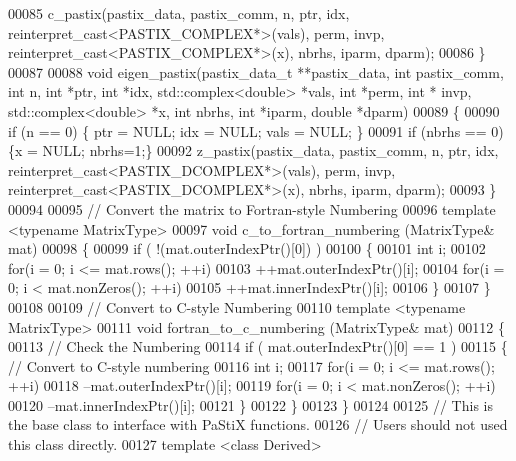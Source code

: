 \begin{DoxyCode}
00085     c\_pastix(pastix\_data, pastix\_comm, n, ptr, idx, reinterpret\_cast<PASTIX\_COMPLEX*>(vals), perm, invp, 
      reinterpret\_cast<PASTIX\_COMPLEX*>(x), nbrhs, iparm, dparm); 
00086   \}
00087   
00088   \textcolor{keywordtype}{void} eigen\_pastix(pastix\_data\_t **pastix\_data, \textcolor{keywordtype}{int} pastix\_comm, \textcolor{keywordtype}{int} n, \textcolor{keywordtype}{int} *ptr, \textcolor{keywordtype}{int} *idx, 
      std::complex<double> *vals, \textcolor{keywordtype}{int} *perm, \textcolor{keywordtype}{int} * invp, std::complex<double> *x, \textcolor{keywordtype}{int} nbrhs, \textcolor{keywordtype}{int} *iparm, \textcolor{keywordtype}{double} *dparm)
00089   \{
00090     \textcolor{keywordflow}{if} (n == 0) \{ ptr = NULL; idx = NULL; vals = NULL; \}
00091     \textcolor{keywordflow}{if} (nbrhs == 0) \{x = NULL; nbrhs=1;\}
00092     z\_pastix(pastix\_data, pastix\_comm, n, ptr, idx, reinterpret\_cast<PASTIX\_DCOMPLEX*>(vals), perm, invp, 
      reinterpret\_cast<PASTIX\_DCOMPLEX*>(x), nbrhs, iparm, dparm); 
00093   \}
00094 
00095   \textcolor{comment}{// Convert the matrix  to Fortran-style Numbering}
00096   \textcolor{keyword}{template} <\textcolor{keyword}{typename} MatrixType>
00097   \textcolor{keywordtype}{void} c\_to\_fortran\_numbering (MatrixType& mat)
00098   \{
00099     \textcolor{keywordflow}{if} ( !(mat.outerIndexPtr()[0]) ) 
00100     \{ 
00101       \textcolor{keywordtype}{int} i;
00102       \textcolor{keywordflow}{for}(i = 0; i <= mat.rows(); ++i)
00103         ++mat.outerIndexPtr()[i];
00104       \textcolor{keywordflow}{for}(i = 0; i < mat.nonZeros(); ++i)
00105         ++mat.innerIndexPtr()[i];
00106     \}
00107   \}
00108   
00109   \textcolor{comment}{// Convert to C-style Numbering}
00110   \textcolor{keyword}{template} <\textcolor{keyword}{typename} MatrixType>
00111   \textcolor{keywordtype}{void} fortran\_to\_c\_numbering (MatrixType& mat)
00112   \{
00113     \textcolor{comment}{// Check the Numbering}
00114     \textcolor{keywordflow}{if} ( mat.outerIndexPtr()[0] == 1 ) 
00115     \{ \textcolor{comment}{// Convert to C-style numbering}
00116       \textcolor{keywordtype}{int} i;
00117       \textcolor{keywordflow}{for}(i = 0; i <= mat.rows(); ++i)
00118         --mat.outerIndexPtr()[i];
00119       \textcolor{keywordflow}{for}(i = 0; i < mat.nonZeros(); ++i)
00120         --mat.innerIndexPtr()[i];
00121     \}
00122   \}
00123 \}
00124 
00125 \textcolor{comment}{// This is the base class to interface with PaStiX functions. }
00126 \textcolor{comment}{// Users should not used this class directly. }
00127 \textcolor{keyword}{template} <\textcolor{keyword}{class} Derived>

\end{DoxyCode}
